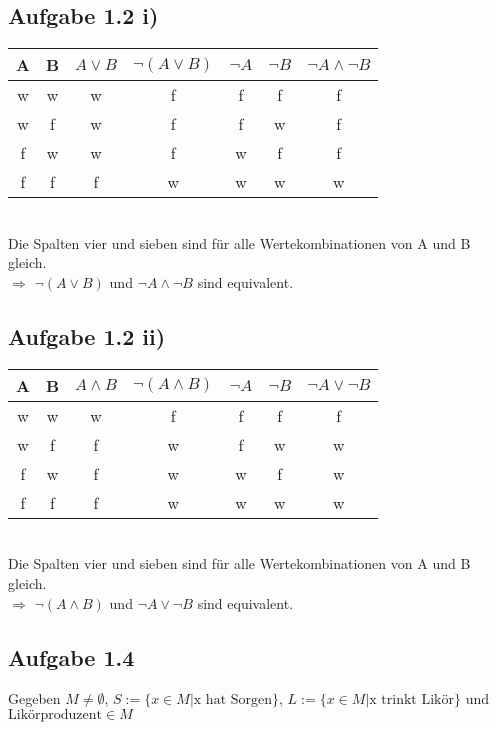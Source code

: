 \documentclass{article}
\begin{document}
    
    \subsection*{Aufgabe 1.2 i)}
        \begin{tabular}{c c c c c c c}
            A & B & \( A \lor B \) & \( \lnot ( A \lor B) \) & \( \lnot A \) & \( \lnot B \) & \( \lnot A \land \lnot B \) \\
            \midrule
            w & w & w & f & f & f & f\\
            w & f & w & f & f & w & f\\
            f & w & w & f & w & f & f\\
            f & f & f & w & w & w & w\\
        \end{tabular} \\
        Die Spalten vier und sieben sind für alle Wertekombinationen von A und B gleich. \\
        \( \Rightarrow \) \( \lnot ( A \lor B) \) und \( \lnot A \land \lnot B \) sind equivalent.

    \subsection*{Aufgabe 1.2 ii)}

        \begin{tabular}{c c c c c c c}
            A & B & \( A \land B \) & \( \lnot ( A \land B ) \) & \( \lnot A \) & \( \lnot B \) & \( \lnot A \lor \lnot B \) \\
            \midrule
            w & w & w & f & f & f & f\\
            w & f & f & w & f & w & w\\
            f & w & f & w & w & f & w\\
            f & f & f & w & w & w & w\\
        \end{tabular} \\
        Die Spalten vier und sieben sind für alle Wertekombinationen von A und B gleich. \\
        \( \Rightarrow \) \( \lnot ( A \land B) \) und \( \lnot A \lor \lnot B \) sind equivalent.

    \subsection*{Aufgabe 1.4}
        Gegeben \(M \not= \emptyset \), \(S:=\{x \in M | \text{x hat Sorgen}\} \), \(L:=\{x \in M | \text{x trinkt Likör}\} \) und \(\text{Likörproduzent} \in M\)
\end{document}
